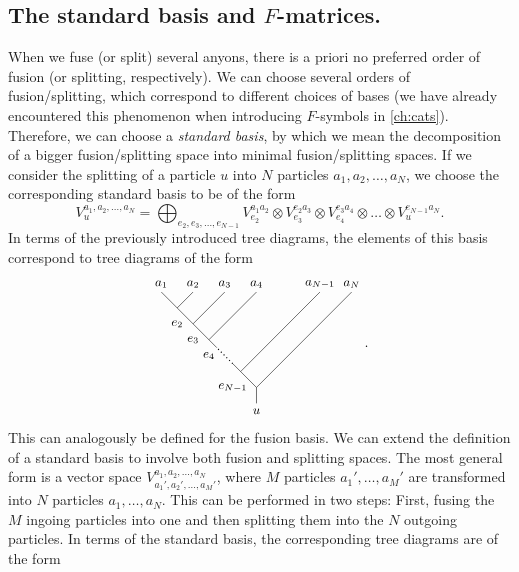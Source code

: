 \subsection*{The standard basis and $F$-matrices.}

When we fuse (or split) several anyons, there is a priori no preferred order of fusion (or splitting, respectively). We can choose several orders of fusion/splitting, which correspond to different choices of bases (we have already encountered this phenomenon when introducing $F$-symbols in \cref{ch:cats}). Therefore, we can choose a \emph{standard basis}, by which we mean the decomposition of a bigger fusion/splitting space into minimal fusion/splitting spaces. If we consider the splitting of a particle $u$ into $N$ particles $a_1,a_2,\dots,a_N$, we choose the corresponding standard basis to be of the form
	\begin{equation}
		V_u^{a_1,a_2,\dots,a_N}=\bigoplus_{e_2,e_3,\dots,e_{N-1}}V_{e_2}^{a_1a_2}\otimes V_{e_3}^{e_2a_3}\otimes V_{e_4}^{e_3a_4}\otimes\dots\otimes V_u^{e_{N-1}a_N}.
	\end{equation}
In terms of the previously introduced tree diagrams, the elements of this basis correspond to tree diagrams of the form
	\begin{equation}
		\begin{tikzpicture}[scale=0.8,baseline=(current bounding box.center)]
			\draw (0,0) -- (0,0.5);
			\draw (0,0.5) -- (-0.5,1);
			\draw (-0.5,1) -- (-0.75,1.25);
			\draw[dotted,thick] (-0.75,1.25) -- (-1.25,1.75);
			\draw (-1.25,1.75) -- (-1.5,2);
			\draw (-1.5,2) -- (-2,2.5);
			\draw (-2,2.5) -- (-2.5,3);
			\draw (-2.5,3) -- (-3,3.5);
			\draw (0,0.5) -- (3,3.5);
			\draw (-0.5,1) -- (2,3.5);
			\draw (-1.5,2) -- (0,3.5);
			\draw (-2,2.5) -- (-1,3.5);
			\draw (-2.5,3) -- (-2,3.5);
			\node at (0,-0.25) {\small $u$};
			\node at (-0.75,0.5) {\small $e_{N-1}$};
			\node at (-2,2) {\small $e_3$};
			\node at (-2.5,2.5) {\small $e_2$};
			\node at (-1.5,1.5) {\small $e_4$};
			\node at (-3,3.75) {\small $a_1$};
			\node at (-2,3.75) {\small $a_2$};
			\node at (-1,3.75) {\small $a_3$};
			\node at (0,3.75) {\small $a_4$};
			\node at (2,3.75) {\small $a_{N-1}$};
			\node at (3,3.75) {\small $a_N$};
		\end{tikzpicture}.
	\end{equation}
This can analogously be defined for the fusion basis. We can extend the definition of a standard basis to involve both fusion and splitting spaces. The most general form is a vector space $V_{a_1',a_2',\dots,a_M'}^{a_1,a_2,\dots,a_N}$, where $M$ particles $a_1',\dots,a_M'$ are transformed into $N$ particles $a_1,\dots,a_N$. This can be performed in two steps: First, fusing the $M$ ingoing particles into one and then splitting them into the $N$ outgoing particles. In terms of the standard basis, the corresponding tree diagrams are of the form
